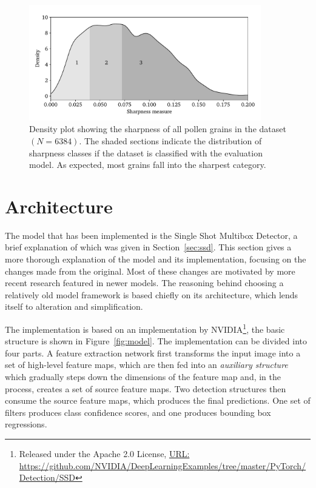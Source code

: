 \begin{figure}[htbp]
  \centering
  \includegraphics[width=0.9\textwidth]{figs/method/sharpness_all.pdf}
  \caption[Distribution of sharpness across entire dataset]{Density plot showing the sharpness of all pollen grains in the dataset \((N=6384)\).
The shaded sections indicate the distribution of sharpness classes if the dataset is classified with the evaluation model.
As expected, most grains fall into the sharpest category.}\label{fig:sharpness-all}
\end{figure}

\section{Architecture}\label{sec:method-arch}

The model that has been implemented is the Single Shot Multibox Detector, a brief explanation of which was given in Section~\ref{sec:ssd}.
This section gives a more thorough explanation of the model and its implementation, focusing on the changes made from the original.
Most of these changes are motivated by more recent research featured in newer models.
The reasoning behind choosing a relatively old model framework is based chiefly on its architecture, which lends itself to alteration and simplification.


The implementation is based on an implementation by NVIDIA\footnote{Released under the Apache 2.0 License, \href{https://github.com/NVIDIA/DeepLearningExamples/tree/master/PyTorch/Detection/SSD}{URL:\\ } \url{https://github.com/NVIDIA/DeepLearningExamples/tree/master/PyTorch/Detection/SSD}}, the basic structure is shown in Figure~\ref{fig:model}.
The implementation can be divided into four parts.
A feature extraction network first transforms the input image into a set of high-level feature maps, which are then fed into an \textit{auxiliary structure} which gradually steps down the dimensions of the feature map and, in the process, creates a set of source feature maps.
Two detection structures then consume the source feature maps, which produces the final predictions.
One set of filters produces class confidence scores, and one produces bounding box regressions.

